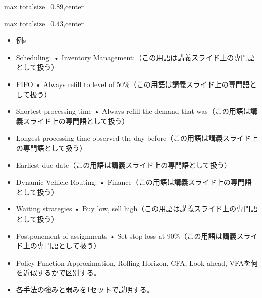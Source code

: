 \begin{minipage}[t]{0.58\textwidth}
\begin{adjustbox}{max totalsize={\textwidth}{0.89\textheight},center}
\begin{minipage}{\textwidth}
\end{minipage}
\end{adjustbox}
\end{minipage}


\clearpage
{}
\begin{minipage}[t]{0.405\textwidth}
\begin{adjustbox}{max totalsize={\textwidth}{0.43\textheight},center}
\begin{minipage}{\textwidth}\scriptsize
{}\begin{itemize}
\item 例s
\item Scheduling: • Inventory Management:（この用語は講義スライド上の専門語として扱う）
\item FIFO • Always refill to level of 50\%（この用語は講義スライド上の専門語として扱う）
\item Shortest processing time • Always refill the demand that was（この用語は講義スライド上の専門語として扱う）
\item Longest processing time observed the day before（この用語は講義スライド上の専門語として扱う）
\item Earliest due date（この用語は講義スライド上の専門語として扱う）
\item Dynamic Vehicle Routing: • Finance（この用語は講義スライド上の専門語として扱う）
\item Waiting strategies • Buy low, sell high（この用語は講義スライド上の専門語として扱う）
\item Postponement of assignments • Set stop loss at 90\%（この用語は講義スライド上の専門語として扱う）
\end{itemize}\begin{itemize}
\item Policy Function Approximation, Rolling Horizon, CFA, Look-ahead, VFAを何を近似するかで区別する。
\item 各手法の強みと弱みを1セットで説明する。
\end{itemize}
\end{minipage}
\end{adjustbox}
\end{minipage}\hfill
